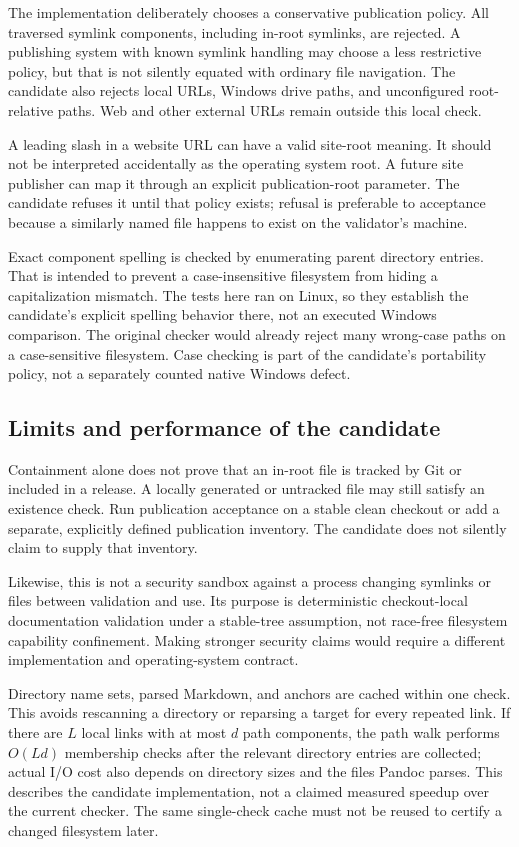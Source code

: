 \documentclass[11pt,letterpaper]{article}
\newcommand{\code}[1]{\texttt{\detokenize{#1}}}
\begin{document}
The implementation deliberately chooses a conservative publication policy.
All traversed symlink components, including in-root symlinks, are rejected.
A publishing system with known symlink handling may choose a less restrictive
policy, but that is not silently equated with ordinary file navigation. The
candidate also rejects local \code{file:} URLs, Windows drive paths, and
unconfigured root-relative paths. Web and other external URLs remain outside
this local check.

A leading slash in a website URL can have a valid site-root meaning. It should
not be interpreted accidentally as the operating system root. A future site
publisher can map it through an explicit publication-root parameter. The
candidate refuses it until that policy exists; refusal is preferable to
acceptance because a similarly named file happens to exist on the validator's
machine.

Exact component spelling is checked by enumerating parent directory entries.
That is intended to prevent a case-insensitive filesystem from hiding a
capitalization mismatch. The tests here ran on Linux, so they establish the
candidate's explicit spelling behavior there, not an executed Windows
comparison. The original checker would already reject many wrong-case paths
on a case-sensitive filesystem. Case checking is part of the candidate's
portability policy, not a separately counted native Windows defect.

\subsection{Limits and performance of the candidate}

Containment alone does not prove that an in-root file is tracked by Git or
included in a release. A locally generated or untracked file may still satisfy
an existence check. Run publication acceptance on a stable clean checkout or
add a separate, explicitly defined publication inventory. The candidate does
not silently claim to supply that inventory.

Likewise, this is not a security sandbox against a process changing symlinks
or files between validation and use. Its purpose is deterministic
checkout-local documentation validation under a stable-tree assumption, not
race-free filesystem capability confinement. Making stronger security claims
would require a different implementation and operating-system contract.

Directory name sets, parsed Markdown, and anchors are cached within one check.
This avoids rescanning a directory or reparsing a target for every repeated
link. If there are $L$ local links with at most $d$ path components, the path
walk performs $O(Ld)$ membership checks after the relevant directory entries
are collected; actual I/O cost also depends on directory sizes and the files
Pandoc parses. This describes the candidate implementation, not a claimed
measured speedup over the current checker. The same single-check cache must
not be reused to certify a changed filesystem later.
\end{document}
